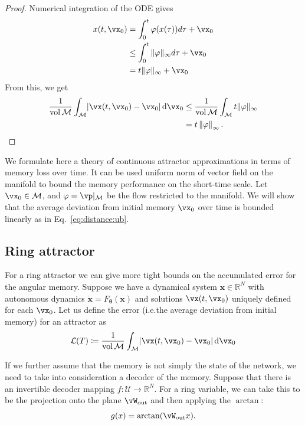 \documentclass{article} %
\newcounter{ct}
\newcommand{\dm}[1]{\ensuremath{\mathrm{d}{#1}}} %
\newcommand{\wout}{\vW_{\text{out}}}
\newcommand{\manifold}{\mathcal{M}}
\newcommand{\uniformNorm}[1]{\left\|#1\right\|_\infty} %
\DeclarePairedDelimiter{\abs}{\lvert}{\rvert}
\theoremstyle{definition}
\theoremstyle{remark}
\begin{document}
\begin{proof}
Numerical integration of the ODE gives
\begin{align*}
x(t,\vx_0) &= \int_0^t\varphi(x(\tau))d\tau + \vx_0 \\
&\leq \int_0^t\|\varphi\|_\infty d\tau + \vx_0 \\
&= t\|\varphi\|_\infty+ \vx_0
\end{align*}
From this, we get
\begin{align*}
\frac{1}{\operatorname{vol}\manifold}\int_\manifold
\abs{\vx(t, \vx_0) - \vx_0}\,
\dm{\vx_0} & \leq \frac{1}{\operatorname{vol}\manifold}\int_\manifold t\|\varphi\|_\infty\\
&= t\uniformNorm{\varphi}.
\end{align*}
\end{proof}



We formulate here a theory of continuous attractor approximations in terms of memory loss over time.
It can be used uniform norm of vector field on the manifold to bound the memory performance on the short-time scale. %
Let \(\vx_0 \in \manifold\), and \(\varphi = \vp\vert_\manifold\) be the flow restricted to the manifold.
We will show that the average deviation from initial memory \(\vx_0\) over time is bounded linearly as in Eq.~\ref{eq:distance:ub}.

\subsection{Ring attractor}
For a ring attractor we can give more tight bounds on the accumulated error for the angular memory.
Suppose we have a dynamical system \(\bm{x} \in \mathbb{R}^N\) with autonomous dynamics \(\dot{ \bm{x}} = F_{\boldsymbol{\theta}} (\bm{x})\) and solutions \(\vx(t, \vx_0)\) uniquely defined for each \(\vx_0\).
Let us define the error (i.e.the  average deviation from initial memory) for an attractor as
\begin{align}
\mathcal{L}(T) \coloneqq
\frac{1}{\operatorname{vol}\manifold}\int_\manifold
\abs{\vx(t, \vx_0) - \vx_0}\,
\dm{\vx_0}
\end{align}

If we further assume that the memory is not simply the state of the network, we need to take into consideration a decoder of the memory.
Suppose that there is an invertible decoder mapping \(f: \mathcal{U} \rightarrow \mathbb{R}^N\). %
For a ring variable, we can take this to be the projection onto the plane \(\wout\) and then applying the \(\arctan\):
\begin{equation}
g(x) = \arctan(\wout x). %
\end{equation}
\end{document}

